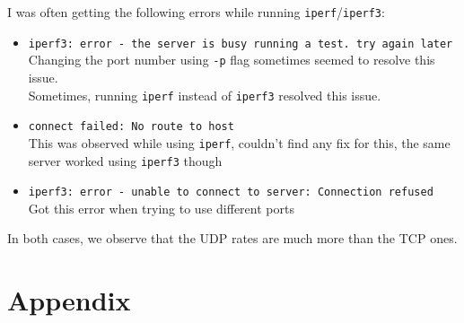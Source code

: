 \documentclass[11pt, fleqn]{article}
\begin{document}
I was often getting the following errors while running \texttt{iperf}/\texttt{iperf3}:
\begin{itemize}[itemsep=-0.5ex]

    \item \texttt{iperf3: error - the server is busy running a test. try again later}\\
    Changing the port number using \texttt{-p} flag sometimes seemed to resolve this issue.\\
    Sometimes, running \texttt{iperf} instead of \texttt{iperf3} resolved this issue.
    
    \item \texttt{connect failed: No route to host}\\
    This was observed while using \texttt{iperf}, couldn't find any fix for this, the same server worked using \texttt{iperf3} though
    
    \item \texttt{iperf3: error - unable to connect to server: Connection refused}\\
    Got this error when trying to use different ports
    
\end{itemize}

\hrulefill
\medskip

In both cases, we observe that the UDP rates are much more than the TCP ones.

\newpage
\section*{Appendix}
\setcounter{equation}{0}
\end{document}
